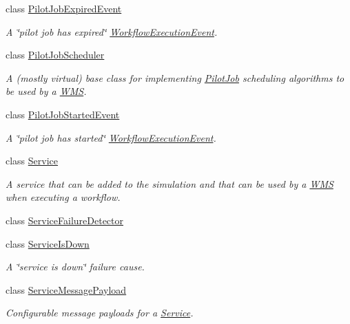\begin{DoxyCompactItemize}
class \hyperlink{classwrench_1_1_pilot_job_expired_event}{Pilot\+Job\+Expired\+Event}
\begin{DoxyCompactList}\small\item\em A \char`\"{}pilot job has expired\char`\"{} \hyperlink{classwrench_1_1_workflow_execution_event}{Workflow\+Execution\+Event}. \end{DoxyCompactList}\item 
class \hyperlink{classwrench_1_1_pilot_job_scheduler}{Pilot\+Job\+Scheduler}
\begin{DoxyCompactList}\small\item\em A (mostly virtual) base class for implementing \hyperlink{classwrench_1_1_pilot_job}{Pilot\+Job} scheduling algorithms to be used by a \hyperlink{classwrench_1_1_w_m_s}{W\+MS}. \end{DoxyCompactList}\item 
class \hyperlink{classwrench_1_1_pilot_job_started_event}{Pilot\+Job\+Started\+Event}
\begin{DoxyCompactList}\small\item\em A \char`\"{}pilot job has started\char`\"{} \hyperlink{classwrench_1_1_workflow_execution_event}{Workflow\+Execution\+Event}. \end{DoxyCompactList}\item 
class \hyperlink{classwrench_1_1_service}{Service}
\begin{DoxyCompactList}\small\item\em A service that can be added to the simulation and that can be used by a \hyperlink{classwrench_1_1_w_m_s}{W\+MS} when executing a workflow. \end{DoxyCompactList}\item 
class \hyperlink{classwrench_1_1_service_failure_detector}{Service\+Failure\+Detector}
\item 
class \hyperlink{classwrench_1_1_service_is_down}{Service\+Is\+Down}
\begin{DoxyCompactList}\small\item\em A \char`\"{}service is down\char`\"{} failure cause. \end{DoxyCompactList}\item 
class \hyperlink{classwrench_1_1_service_message_payload}{Service\+Message\+Payload}
\begin{DoxyCompactList}\small\item\em Configurable message payloads for a \hyperlink{classwrench_1_1_service}{Service}. \end{DoxyCompactList}\item 

\end{DoxyCompactItemize}
